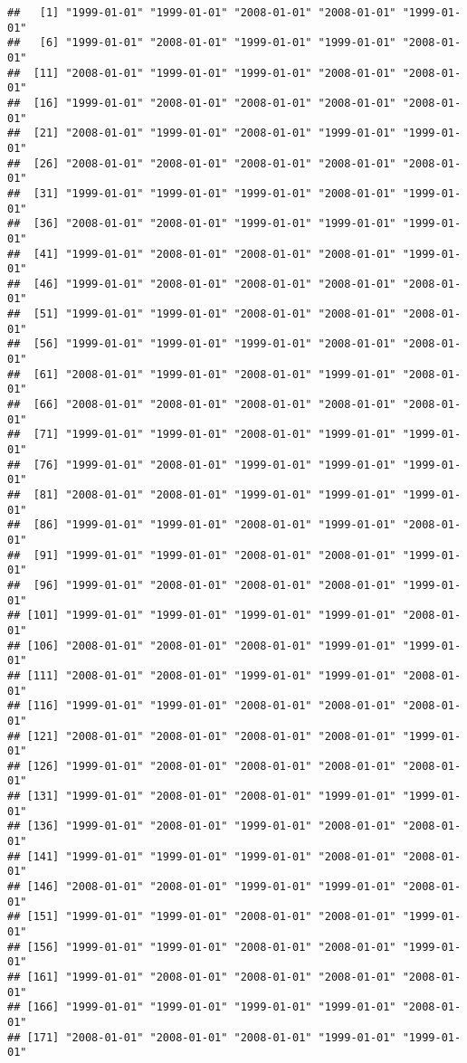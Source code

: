 \documentclass[
]{article}
\begin{document}
\begin{verbatim}
##   [1] "1999-01-01" "1999-01-01" "2008-01-01" "2008-01-01" "1999-01-01"
##   [6] "1999-01-01" "2008-01-01" "1999-01-01" "1999-01-01" "2008-01-01"
##  [11] "2008-01-01" "1999-01-01" "1999-01-01" "2008-01-01" "2008-01-01"
##  [16] "1999-01-01" "2008-01-01" "2008-01-01" "2008-01-01" "2008-01-01"
##  [21] "2008-01-01" "1999-01-01" "2008-01-01" "1999-01-01" "1999-01-01"
##  [26] "2008-01-01" "2008-01-01" "2008-01-01" "2008-01-01" "2008-01-01"
##  [31] "1999-01-01" "1999-01-01" "1999-01-01" "2008-01-01" "1999-01-01"
##  [36] "2008-01-01" "2008-01-01" "1999-01-01" "1999-01-01" "1999-01-01"
##  [41] "1999-01-01" "2008-01-01" "2008-01-01" "2008-01-01" "1999-01-01"
##  [46] "1999-01-01" "2008-01-01" "2008-01-01" "2008-01-01" "2008-01-01"
##  [51] "1999-01-01" "1999-01-01" "2008-01-01" "2008-01-01" "2008-01-01"
##  [56] "1999-01-01" "1999-01-01" "1999-01-01" "2008-01-01" "2008-01-01"
##  [61] "2008-01-01" "1999-01-01" "2008-01-01" "1999-01-01" "2008-01-01"
##  [66] "2008-01-01" "2008-01-01" "2008-01-01" "2008-01-01" "2008-01-01"
##  [71] "1999-01-01" "1999-01-01" "2008-01-01" "1999-01-01" "1999-01-01"
##  [76] "1999-01-01" "2008-01-01" "1999-01-01" "1999-01-01" "1999-01-01"
##  [81] "2008-01-01" "2008-01-01" "1999-01-01" "1999-01-01" "1999-01-01"
##  [86] "1999-01-01" "1999-01-01" "2008-01-01" "1999-01-01" "2008-01-01"
##  [91] "1999-01-01" "1999-01-01" "2008-01-01" "2008-01-01" "1999-01-01"
##  [96] "1999-01-01" "2008-01-01" "2008-01-01" "2008-01-01" "1999-01-01"
## [101] "1999-01-01" "1999-01-01" "1999-01-01" "1999-01-01" "2008-01-01"
## [106] "2008-01-01" "2008-01-01" "2008-01-01" "1999-01-01" "1999-01-01"
## [111] "2008-01-01" "2008-01-01" "1999-01-01" "1999-01-01" "2008-01-01"
## [116] "1999-01-01" "1999-01-01" "2008-01-01" "2008-01-01" "2008-01-01"
## [121] "2008-01-01" "2008-01-01" "2008-01-01" "2008-01-01" "1999-01-01"
## [126] "1999-01-01" "2008-01-01" "2008-01-01" "2008-01-01" "2008-01-01"
## [131] "1999-01-01" "2008-01-01" "2008-01-01" "1999-01-01" "1999-01-01"
## [136] "1999-01-01" "2008-01-01" "1999-01-01" "2008-01-01" "2008-01-01"
## [141] "1999-01-01" "1999-01-01" "1999-01-01" "2008-01-01" "2008-01-01"
## [146] "2008-01-01" "2008-01-01" "1999-01-01" "1999-01-01" "2008-01-01"
## [151] "1999-01-01" "1999-01-01" "2008-01-01" "2008-01-01" "1999-01-01"
## [156] "1999-01-01" "1999-01-01" "2008-01-01" "2008-01-01" "1999-01-01"
## [161] "1999-01-01" "2008-01-01" "2008-01-01" "2008-01-01" "2008-01-01"
## [166] "1999-01-01" "1999-01-01" "1999-01-01" "1999-01-01" "2008-01-01"
## [171] "2008-01-01" "2008-01-01" "2008-01-01" "1999-01-01" "1999-01-01"

\end{verbatim}
\end{document}
